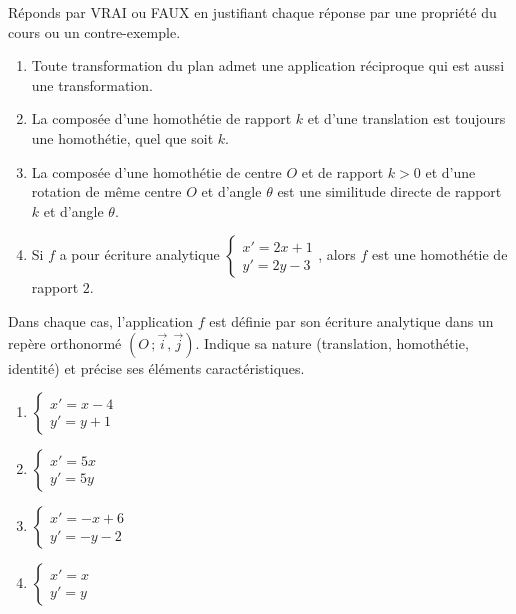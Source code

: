 \documentclass[11pt]{article}
\begin{document}
\begin{exercice}
Réponds par VRAI ou FAUX en justifiant chaque réponse par une propriété du cours ou un contre-exemple.
\begin{enumerate}
\item Toute transformation du plan admet une application réciproque qui est aussi une transformation.
\item La composée d'une homothétie de rapport $k$ et d'une translation est toujours une homothétie, quel que soit $k$.
\item La composée d'une homothétie de centre $O$ et de rapport $k > 0$ et d'une rotation de même centre $O$ et d'angle $\theta$ est une similitude directe de rapport $k$ et d'angle $\theta$.
\item Si $f$ a pour écriture analytique $\begin{cases} x' = 2x + 1 \\ y' = 2y - 3 \end{cases}$, alors $f$ est une homothétie de rapport $2$.
\end{enumerate}
\end{exercice}

\begin{exercice}
Dans chaque cas, l'application $f$ est définie par son écriture analytique dans un repère orthonormé $(O\,;\vec{i},\vec{j})$. Indique sa nature (translation, homothétie, identité) et précise ses éléments caractéristiques.
\begin{enumerate}
\item $\begin{cases} x' = x - 4 \\ y' = y + 1 \end{cases}$
\item $\begin{cases} x' = 5x \\ y' = 5y \end{cases}$
\item $\begin{cases} x' = -x + 6 \\ y' = -y - 2 \end{cases}$
\item $\begin{cases} x' = x \\ y' = y \end{cases}$
\end{enumerate}
\end{exercice}
\end{document}
